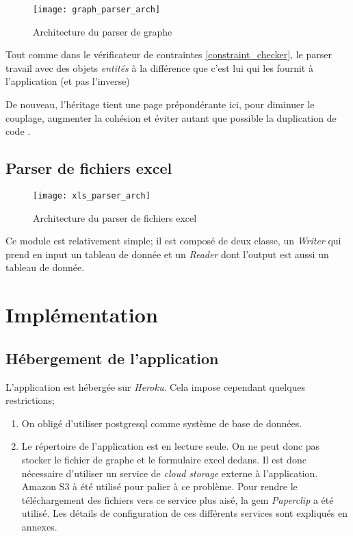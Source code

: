 \begin{figure}[H]
\centering
\caption{Architecture du parser de graphe}
\label{fig:graph_parser_arch}
\texttt{[image: graph\_parser\_arch]}
\end{figure}

Tout comme dans le vérificateur de contraintes \ref{constraint_checker}, le parser travail avec des objets \textit{entités} à la différence que c'est lui qui les fournit à l'application (et pas l'inverse)

De nouveau, l'héritage tient une page prépondérante ici, pour diminuer le couplage, augmenter la cohésion  et éviter autant que possible la duplication de code \cite{cohesion_couplage}. 

\subsection{Parser de fichiers excel}
\label{xls_parser}
\begin{figure}[H]
\centering
\caption{Architecture du parser de fichiers excel}
\label{xls_parser_arch}
\texttt{[image: xls\_parser\_arch]}
\end{figure}

Ce module est relativement simple; il est composé de deux classe, un \textit{Writer} qui prend en input un tableau de donnée et un \textit{Reader} dont l'output est aussi un tableau de donnée.


\clearpage
\section{Implémentation}
\subsection{Hébergement de l'application}
L'application est hébergée sur \textit{Heroku}. Cela impose cependant quelques restrictions;
\begin{enumerate}
  \item On obligé d'utiliser postgresql comme système de base de données.
  \item Le répertoire de l'application est en lecture seule. On ne peut donc pas stocker le fichier de graphe et le formulaire excel dedans. Il est donc nécessaire d'utiliser un service de \textit{cloud storage} externe à l'application. Amazon S3 à été utilisé pour palier à ce problème. Pour rendre le téléchargement des fichiers vers ce service plus aisé, la gem \textit{Paperclip} a été utilisé. Les détails de configuration de ces différents services sont expliqués en annexes. 
\end{enumerate}

